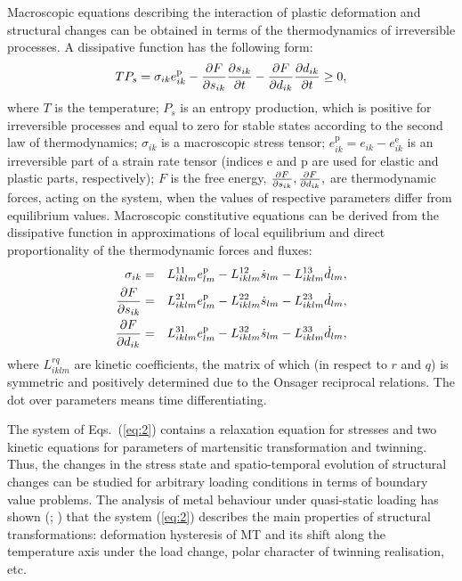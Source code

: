 \documentclass[sw,bibself]{svjour}
\begin{document}
Macroscopic equations describing the interaction of\break
plastic deformation and
structural changes can be obtained in terms of the thermodynamics of
irreversible processes. A dissipative function has the following form:
%
\begin{equation}
TP_{s} = \sigma_{ik} e_{ik}^{\mathrm{p}}
- {{\partial F} \over {\partial s_{ik}}}
{{\partial s_{ik}} \over {\partial t}}
- {{\partial F} \over {\partial d_{ik}}}
{{\partial d_{ik}} \over {\partial t}} \ge 0,
\label{eq:1}
\end{equation}
%
where $T$ is the temperature; $P_{s}$ is an entropy production,
which is positive for
irreversible processes and equal to zero for stable states according to
the second law of thermodynamics; $\sigma_{ik}$
is a macroscopic stress tensor;
$e_{ik}^{\mathrm{p}} = e_{ik} - e_{ik}^{\mathrm{e}}$
is an irreversible part of a strain rate tensor (indices e and p are
used for elastic and plastic parts, respectively);
$F$ is the free energy,
${ {\partial F} \over {\partial s_{ik} } },
{ {\partial F} \over {\partial d_{ik} } },$
are thermodynamic forces, acting on the system, when the values of
respective parameters differ from equilibrium values.
Macroscopic constitutive equations can be derived from the dissipative
function in approximations of local equilibrium and direct proportionality
of the thermodynamic forces and fluxes:
\begin{eqnarray}
\sigma_{ik}&=&L_{iklm}^{11} e_{lm}^{\mathrm{p}}
- L_{iklm}^{12} \dot{s}_{lm}
- L_{iklm}^{13} \dot{d}_{lm} ,\nonumber\\
%
{ {\partial F} \over {\partial s_{ik} } }&=&
L_{iklm}^{21} e_{lm}^{\mathrm{p}}
- L_{iklm}^{22} \dot{s}_{lm}
- L_{iklm}^{23} \dot{d}_{lm} ,\nonumber\\
%
{ {\partial F} \over {\partial d_{ik} } }&=&
L_{iklm}^{31} e_{lm}^{\mathrm{p}}
- L_{iklm}^{32} \dot{s}_{lm}
- L_{iklm}^{33} \dot{d}_{lm} ,
\label{eq:2}
\end{eqnarray}
%
where $L_{iklm}^{rq}$ are kinetic coefficients, the
matrix of which (in respect to $r$ and $q$)
is symmetric and positively determined due to the Onsager reciprocal
relations. The dot over parameters means time differentiating.


The system of Eqs.~(\ref{eq:2}) contains a relaxation equation for
stresses
and two kinetic equations for parameters of martensitic transformation and
twinning. Thus, the changes in the stress state and spatio-temporal
evolution of structural changes can be studied for arbitrary loading
conditions in terms of boundary value problems. The analysis of metal
behaviour under quasi-static loading has shown
(\cite[1990]{ref21}; \cite{ref20,ref23}) that the system (\ref{eq:2})
describes the main properties of structural transformations:
deformation hysteresis of MT and its shift along the temperature axis under
the load change, polar character of twinning realisation, etc.
\end{document}
